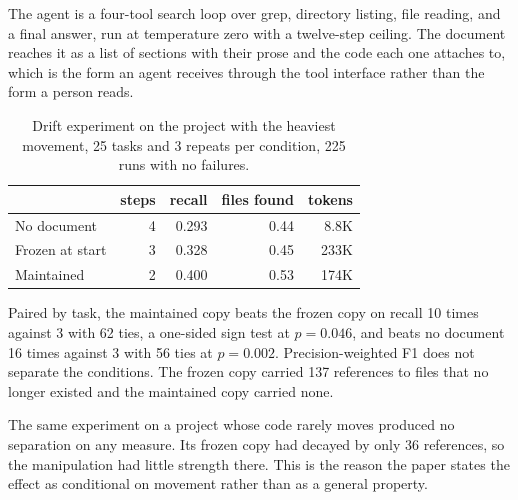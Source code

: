 The agent is a four-tool search loop over grep, directory listing, file reading, and a final answer, run at temperature zero with a twelve-step ceiling. The document reaches it as a list of sections with their prose and the code each one attaches to, which is the form an agent receives through the tool interface rather than the form a person reads.

\begin{table}[h]
\centering
\small
\begin{tabular}{lrrrr}
\toprule
 & steps & recall & files found & tokens \\
\midrule
No document & 4 & 0.293 & 0.44 & 8.8K \\
Frozen at start & 3 & 0.328 & 0.45 & 233K \\
Maintained & 2 & 0.400 & 0.53 & 174K \\
\bottomrule
\end{tabular}
\caption{Drift experiment on the project with the heaviest movement, 25 tasks and 3 repeats per condition, 225 runs with no failures.}
\label{tab:drift}
\end{table}

Paired by task, the maintained copy beats the frozen copy on recall 10 times against 3 with 62 ties, a one-sided sign test at $p = 0.046$, and beats no document 16 times against 3 with 56 ties at $p = 0.002$. Precision-weighted F1 does not separate the conditions. The frozen copy carried 137 references to files that no longer existed and the maintained copy carried none.

The same experiment on a project whose code rarely moves produced no separation on any measure. Its frozen copy had decayed by only 36 references, so the manipulation had little strength there. This is the reason the paper states the effect as conditional on movement rather than as a general property.

